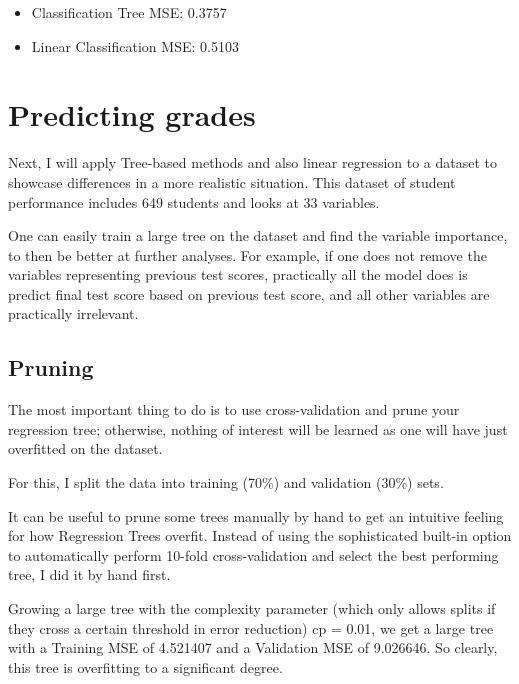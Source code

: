 \documentclass[12pt]{article}
\begin{document}
\begin{itemize}
    \item Classification Tree MSE: 0.3757
    \item Linear Classification MSE: 0.5103
\end{itemize}


\section{Predicting grades}

Next, I will apply Tree-based methods and also linear regression to a dataset to showcase differences in a more realistic situation. This dataset of student performance includes 649 students and looks at 33 variables.

One can easily train a large tree on the dataset and find the variable importance, to then be better at further analyses. For example, if one does not remove the variables representing previous test scores, practically all the model does is predict final test score based on previous test score, and all other variables are practically irrelevant.


\subsection{Pruning}

The most important thing to do is to use cross-validation and prune your regression tree; otherwise, nothing of interest will be learned as one will have just overfitted on the dataset.

For this, I split the data into training (70\%) and validation (30\%) sets.

It can be useful to prune some trees manually by hand to get an intuitive feeling for how Regression Trees overfit. Instead of using the sophisticated built-in option to automatically perform 10-fold cross-validation and select the best performing tree, I did it by hand first.

Growing a large tree with the complexity parameter (which only allows splits if they cross a certain threshold in error reduction) cp = 0.01, we get a large tree with a Training MSE of 4.521407 and a Validation MSE of 9.026646. So clearly, this tree is overfitting to a significant degree.
\end{document}

